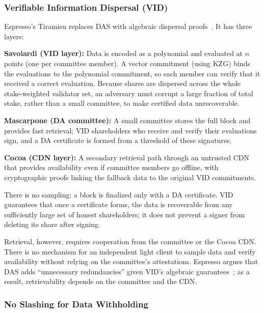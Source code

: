\subsubsection{Verifiable Information Dispersal (VID)}

Espresso's Tiramisu replaces DAS with algebraic dispersal proofs~\cite{Espresso:Hotshot_and_Triamisu}.
It has three layers:

\squishlist
\item \textbf{Savoiardi (VID layer):} Data is encoded as a polynomial and evaluated at $n$ points (one per committee member). A vector commitment (using KZG) binds the evaluations to the polynomial commitment, so each member can verify that it received a correct evaluation. Because shares are dispersed across the whole stake-weighted validator set, an adversary must corrupt a large fraction of total stake, rather than a small committee, to make certified data unrecoverable.

\item \textbf{Mascarpone (DA committee):} A small committee stores the full block and provides fast retrieval; VID shareholders who receive and verify their evaluations sign, and a DA certificate is formed from a threshold of these signatures.

\item \textbf{Cocoa (CDN layer):} A secondary retrieval path through an untrusted CDN that provides availability even if committee members go offline, with cryptographic proofs linking the fallback data to the original VID commitments.
\squishend

There is no sampling: a block is finalized only with a DA certificate. VID guarantees that once a certificate forms, the data is recoverable from any sufficiently large set of honest shareholders; it does not prevent a signer from deleting its share after signing.

Retrieval, however, requires cooperation from the committee or the Cocoa CDN.
There is no mechanism for an independent light client to sample data and verify availability without relying on the committee's attestations.
Espresso argues that DAS adds ``unnecessary redundancies'' given VID's algebraic guarantees~\cite{Espresso:Hotshot_and_Triamisu}; as a result, retrievability depends on the committee and the CDN.

\subsubsection{No Slashing for Data Withholding}


